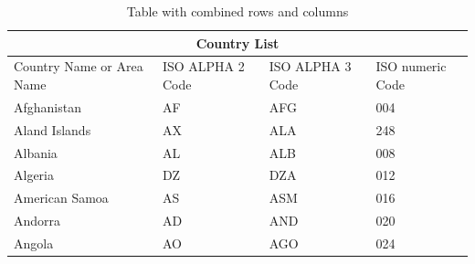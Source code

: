 \documentclass[Theme1]{{template_material/eurostat}}
\begin{document}
\begin{table}[h]
 \caption{Table with combined rows and columns}
 \label{table:B}
    \begin{tabular}{ p{3cm}|p{3cm}|p{3cm}|p{3cm}  }
     \hline
     \multicolumn{4}{c}{\cellcolor{TH20p} Country List} \\
     \hline
     \rowcolor{TH20p} 
     Country Name     or Area Name& ISO ALPHA 2 Code &ISO ALPHA 3 Code&ISO numeric Code\\
     \hline
     Afghanistan   & AF    &AFG&   004\\
     Aland Islands&   AX  & ALA   &248\\
     Albania &AL & ALB&  008\\
     Algeria    &DZ & DZA&  012\\
     American Samoa&   AS  & ASM&016\\
     Andorra& AD  & AND   &020\\
     Angola& AO  & AGO&024\\
     \hline
    \end{tabular}
\end{table}



\thispagestyle{numstylelscape}
\pagestyle{numstylelscape}
\end{document}
